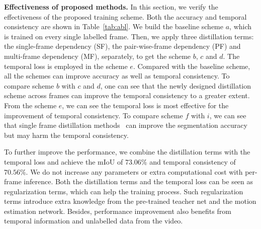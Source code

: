 \documentclass[runningheads]{llncs}
\begin{document}
\noindent\textbf{Effectiveness of proposed methods.}
In this section, we verify the effectiveness of the proposed training scheme. Both the accuracy and temporal consistency are shown in Table~\ref{tab:abl}. We build the baseline scheme $a$, which is trained on every single labelled frame. Then, we apply three distillation
terms:
the single-frame dependency (SF),  the pair-wise-frame dependency (PF) and multi-frame dependency (MF), separately, to get the scheme ${b}$, ${c}$ and ${d}$. The temporal loss is employed in the scheme ${e}$. Compared with the baseline scheme, all the schemes can improve accuracy as well as temporal consistency.  To compare scheme ${b}$ with ${c}$ and ${d}$, one can see that the newly designed distillation scheme across frames can improve the temporal consistency to a greater extent. From the scheme ${e}$, we can see the temporal loss is most effective for the improvement of temporal consistency. To compare scheme ${f}$ with ${i}$, we can see that single frame distillation methods~\cite{liu2019structured} can improve the segmentation accuracy but may harm the temporal consistency.

To further improve the performance, we combine the distillation terms with the temporal loss and achieve the mIoU of $73.06\%$ and temporal consistency of $70.56\%$. We do not increase any parameters or extra computational cost with per-frame inference. Both the distillation terms and the temporal loss can be seen as regularization terms, which can help the training process. Such regularization terms introduce extra knowledge from the pre-trained teacher net and the motion estimation network. Besides, performance improvement also benefits from temporal information and unlabelled data from the video.
\end{document}
